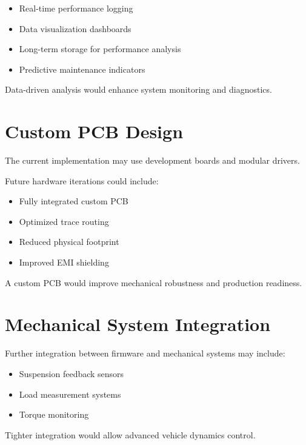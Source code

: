 \begin{itemize}
	\item Real-time performance logging
	\item Data visualization dashboards
	\item Long-term storage for performance analysis
	\item Predictive maintenance indicators
\end{itemize}

Data-driven analysis would enhance system monitoring and diagnostics.


\section{Custom PCB Design}

The current implementation may use development boards and modular drivers.

Future hardware iterations could include:

\begin{itemize}
	\item Fully integrated custom PCB
	\item Optimized trace routing
	\item Reduced physical footprint
	\item Improved EMI shielding
\end{itemize}

A custom PCB would improve mechanical robustness and production readiness.


\section{Mechanical System Integration}

Further integration between firmware and mechanical systems may include:

\begin{itemize}
	\item Suspension feedback sensors
	\item Load measurement systems
	\item Torque monitoring
\end{itemize}

Tighter integration would allow advanced vehicle dynamics control.



